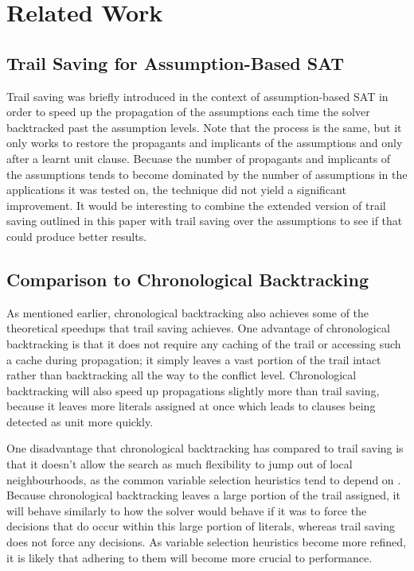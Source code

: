 \documentclass[runningheads]{llncs}
\begin{document}
\section{Related Work}
\subsection{Trail Saving for Assumption-Based SAT}
Trail saving was briefly introduced in the context of assumption-based
SAT \cite{DBLP:conf/sat/HickeyB19} in order to speed up the
propagation of the assumptions each time the solver backtracked past
the assumption levels. Note that the process is the same, but it only
works to restore the propagants and implicants of the assumptions and
only after a learnt unit clause. Becuase the number of propagants and
implicants of the assumptions tends to become dominated by the number
of assumptions in the applications it was tested on, the technique did
not yield a significant improvement. It would be interesting to
combine the extended version of trail saving outlined in this paper
with trail saving over the assumptions to see if that could produce
better results.

\subsection{Comparison to Chronological Backtracking}
As mentioned earlier, chronological backtracking also achieves some of
the theoretical speedups that trail saving achieves. One advantage of
chronological backtracking is that it does not require any caching of
the trail or accessing such a cache during propagation; it simply
leaves a vast portion of the trail intact rather than backtracking all
the way to the conflict level. Chronological backtracking will also
speed up propagations slightly more than trail saving, because it
leaves more literals assigned at once which leads to clauses being
detected as unit more quickly.

One disadvantage that chronological backtracking has compared to trail
saving is that it doesn't allow the search as much flexibility to jump
out of local neighbourhoods, as the common variable selection
heuristics tend to depend on
\cite{DBLP:conf/dac/MoskewiczMZZM01,DBLP:conf/sat/2015,DBLP:conf/sat/LiangGPC16}. Because
chronological backtracking leaves a large portion of the trail
assigned, it will behave similarly to how the solver would behave if
it was to force the decisions that do occur within this large portion
of literals, whereas trail saving does not force any decisions. As
variable selection heuristics become more refined, it is likely that
adhering to them will become more crucial to performance.
\end{document}
